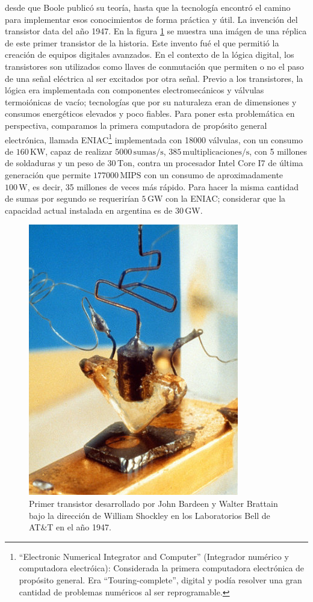 desde que Boole publicó su teoría, hasta que la tecnología encontró el camino
para implementar esos conocimientos de forma práctica y útil. La invención del
transistor data del año 1947. En la figura \ref{fig:C02-primer_transistor} se
muestra una imágen de una réplica de este primer transistor de la historia. Este
invento fué el que permitió la creación de equipos digitales avanzados. En el
contexto de la lógica digital, los transistores son utilizados como llaves de
conmutación que permiten o no el paso de una señal eléctrica al ser excitados
por otra señal. Previo a los transistores, la lógica era implementada con
componentes electromecánicos y válvulas termoiónicas de vacío; tecnologías que
por su naturaleza eran de dimensiones y consumos energéticos elevados y poco
fiables. Para poner esta problemática en perspectiva, comparamos la primera
computadora de propósito general electrónica, llamada
ENIAC\footnote{``Electronic Numerical Integrator and Computer'' (Integrador
numérico y computadora electróica): Considerada la primera computadora
electrónica de propósito general. Era ``Touring-complete'', digital y podía
resolver una gran cantidad de problemas numéricos al ser reprogramable.}
implementada con 18000 válvulas, con un consumo de $160\,\mathrm{KW}$, capaz de
realizar $5000\,\mathrm{sumas/s}$, $385\,\mathrm{multiplicaciones/s}$, con 5
millones de soldaduras y un peso de $30\,\mathrm{Ton}$, contra un procesador
Intel Core I7 de última generación que permite $177000\,\mathrm{MIPS}$ con un
consumo de aproximadamente $100\,\mathrm{W}$, es decir, 35 millones de veces más
rápido. Para hacer la misma cantidad de sumas por segundo se requerirían
$5\,\mathrm{GW}$ con la ENIAC; considerar que la capacidad actual instalada en
argentina es de $30\,\mathrm{GW}$.
\begin{figure}
  \centering
  \includegraphics[scale=0.5]{./figures/C02-primer_transistor}
  \captionsetup{justification=centering}
  \caption{Primer transistor desarrollado por John Bardeen y Walter 
    Brattain bajo la dirección de William Shockley en los Laboratorios Bell de 
    AT\&T en el año 1947.}
  \label{fig:C02-primer_transistor}
\end{figure}

